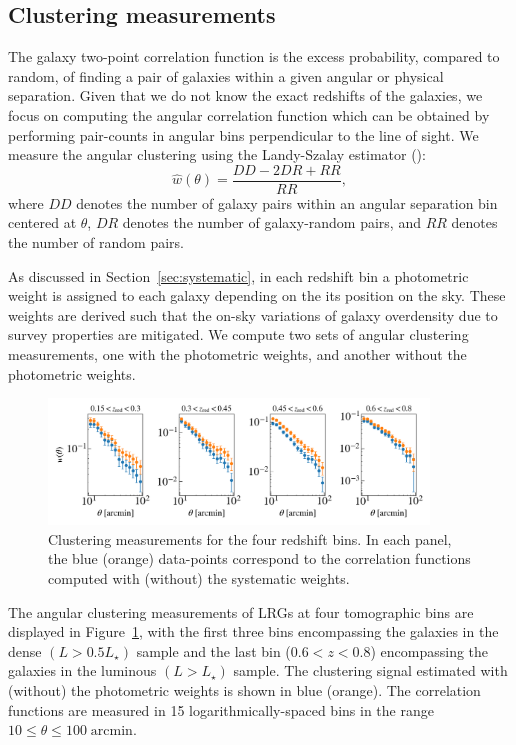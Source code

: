 \documentclass{aa}
\numberwithin{equation}{section}
\begin{document}
\subsection{Clustering measurements}\label{sec:measurement}

The galaxy two-point correlation function is the excess probability, compared to random, of finding a pair of galaxies within a given angular or physical separation. Given that we do not know the exact redshifts of the galaxies, we focus on computing the angular correlation function which can be obtained by performing pair-counts in angular bins perpendicular to the line of sight. We measure the angular clustering using the Landy-Szalay estimator (\citealt{landy}):
\begin{equation}
    \widehat{w}(\theta) = \frac{DD-2DR+RR}{RR},
\label{eq:landy}
\end{equation}
where $DD$ denotes the number of galaxy pairs within an angular separation bin centered at $\theta$, $DR$ denotes the number of galaxy-random pairs, and $RR$ denotes the number of random pairs. 

As discussed in Section~\ref{sec:systematic}, in each redshift bin a photometric weight is assigned to each galaxy depending on the its position on the sky. These weights are derived such that the on-sky variations of galaxy overdensity due to survey properties are mitigated. We compute two sets of angular clustering measurements, one with the photometric weights, and another without the photometric weights. 

\begin{figure}
\centring
\includegraphics[width=0.9\textwidth]{figures_tmp/woftheta.png}
\caption{Clustering measurements for the four redshift bins. In each panel, the blue (orange) data-points correspond to the correlation functions computed with (without) the systematic weights.} 
\label{fig:xi} 
\end{figure}

The angular clustering measurements of LRGs at four tomographic bins are displayed in Figure~\ref{fig:xi}, with the first three bins encompassing the galaxies in the dense $(L> 0.5L_{\star})$ sample and the last bin ($0.6<z<0.8$) encompassing the galaxies in the luminous $(L> L_{\star})$ sample. The clustering signal estimated with (without) the photometric weights is shown in blue (orange). The correlation functions are measured in 15 logarithmically-spaced bins in the range $ 10\leq \theta \leq 100 \; \mathrm{arcmin}$. 
\end{document}
